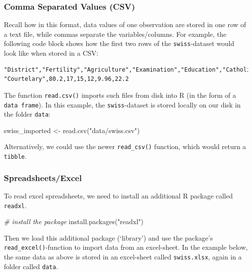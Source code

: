 \documentclass[
  12pt,
]{style/krantz}
\newenvironment{Shaded}{\begin{snugshade}}{\end{snugshade}}
\newcommand{\CommentTok}[1]{\textcolor[rgb]{0.56,0.35,0.01}{\textit{#1}}}
\newcommand{\FunctionTok}[1]{\textcolor[rgb]{0.00,0.00,0.00}{#1}}
\newcommand{\NormalTok}[1]{#1}
\newcommand{\OtherTok}[1]{\textcolor[rgb]{0.56,0.35,0.01}{#1}}
\newcommand{\StringTok}[1]{\textcolor[rgb]{0.31,0.60,0.02}{#1}}
\begin{document}
\hypertarget{comma-separated-values-csv}{%
\subsubsection{Comma Separated Values (CSV)}\label{comma-separated-values-csv}}

Recall how in this format, data values of one observation are stored in one row of a text file, while commas separate the variables/columns. For example, the following code block shows how the first two rows of the \texttt{swiss}-dataset would look like when stored in a CSV:

\begin{verbatim}
"District","Fertility","Agriculture","Examination","Education","Catholic","Infant.Mortality"
"Courtelary",80.2,17,15,12,9.96,22.2
\end{verbatim}

The function \texttt{read.csv()} imports such files from disk into R (in the form of a \texttt{data\ frame}). In this example, the \texttt{swiss}-dataset is stored locally on our disk in the folder \texttt{data}:

\begin{Shaded}
\begin{Highlighting}[]
\NormalTok{swiss\_imported }\OtherTok{\textless{}{-}} \FunctionTok{read.csv}\NormalTok{(}\StringTok{"data/swiss.csv"}\NormalTok{)}
\end{Highlighting}
\end{Shaded}

Alternatively, we could use the newer \texttt{read\_csv()} function, which would return a \texttt{tibble}.

\hypertarget{spreadsheetsexcel}{%
\subsubsection{Spreadsheets/Excel}\label{spreadsheetsexcel}}

To read excel spreadsheets, we need to install an additional R package called \texttt{readxl}.

\begin{Shaded}
\begin{Highlighting}[]
\CommentTok{\# install the package}
\FunctionTok{install.packages}\NormalTok{(}\StringTok{"readxl"}\NormalTok{)}
\end{Highlighting}
\end{Shaded}

Then we load this additional package (`library') and use the package's \texttt{read\_excel()}-function to import data from an excel-sheet. In the example below, the same data as above is stored in an excel-sheet called \texttt{swiss.xlsx}, again in a folder called \texttt{data}.
\end{document}
